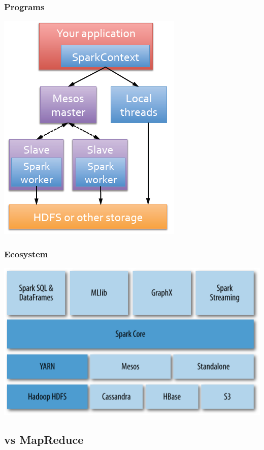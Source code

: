 \documentclass{beamer}
\begin{document}
\begin{frame}
  \frametitle{Programs}
  \center
  \includegraphics[height=.8\textheight]{images/sparkapp.png}
\end{frame}

\begin{frame}
  \frametitle{Ecosystem}
  \includegraphics[width=\textwidth]{images/sparkecosystem.png}
\end{frame}

\subsection{vs MapReduce}
\end{document}
